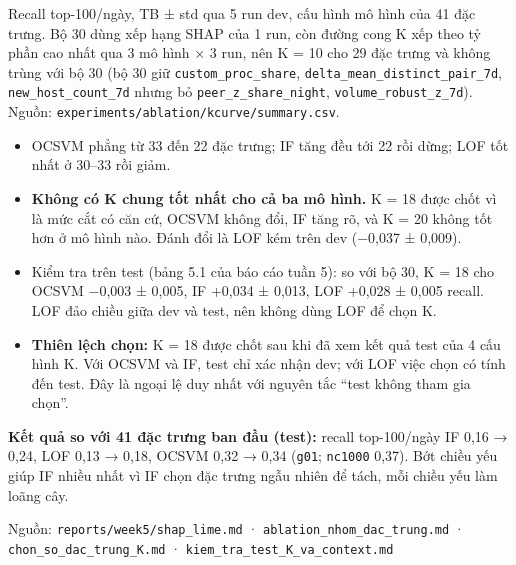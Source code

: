 \documentclass[
  11pt,
]{article}
\providecommand{\tightlist}{%
  \setlength{\itemsep}{0pt}\setlength{\parskip}{0pt}}
\begin{document}
Recall top-100/ngày, TB ± std qua 5 run dev, cấu hình mô hình của 41 đặc
trưng. Bộ 30 dùng xếp hạng SHAP của 1 run, còn đường cong K xếp theo tỷ
phần cao nhất qua 3 mô hình × 3 run, nên K = 10 cho 29 đặc trưng và
không trùng với bộ 30 (bộ 30 giữ
\texttt{custom\_\allowbreak{}proc\_\allowbreak{}share},
\texttt{delta\_\allowbreak{}mean\_\allowbreak{}distinct\_\allowbreak{}pair\_\allowbreak{}7d},
\texttt{new\_\allowbreak{}host\_\allowbreak{}count\_\allowbreak{}7d}
nhưng bỏ
\texttt{peer\_\allowbreak{}z\_\allowbreak{}share\_\allowbreak{}night},
\texttt{volume\_\allowbreak{}robust\_\allowbreak{}z\_\allowbreak{}7d}).
Nguồn:
\texttt{experiments/\allowbreak{}ablation/\allowbreak{}kcurve/\allowbreak{}summary.\allowbreak{}csv}.

\begin{itemize}
\tightlist
\item
  OCSVM phẳng từ 33 đến 22 đặc trưng; IF tăng đều tới 22 rồi dừng; LOF
  tốt nhất ở 30--33 rồi giảm.
\item
  \textbf{Không có K chung tốt nhất cho cả ba mô hình.} K = 18 được chốt
  vì là mức cắt có căn cứ, OCSVM không đổi, IF tăng rõ, và K = 20 không
  tốt hơn ở mô hình nào. Đánh đổi là LOF kém trên dev (−0,037 ± 0,009).
\item
  Kiểm tra trên test (bảng 5.1 của báo cáo tuần 5): so với bộ 30, K = 18
  cho OCSVM −0,003 ± 0,005, IF +0,034 ± 0,013, LOF +0,028 ± 0,005
  recall. LOF đảo chiều giữa dev và test, nên không dùng LOF để chọn K.
\item
  \textbf{Thiên lệch chọn:} K = 18 được chốt sau khi đã xem kết quả test
  của 4 cấu hình K. Với OCSVM và IF, test chỉ xác nhận dev; với LOF việc
  chọn có tính đến test. Đây là ngoại lệ duy nhất với nguyên tắc ``test
  không tham gia chọn''.
\end{itemize}

\textbf{Kết quả so với 41 đặc trưng ban đầu (test):} recall top-100/ngày
IF 0,16 → 0,24, LOF 0,13 → 0,18, OCSVM 0,32 → 0,34 (\texttt{g01};
\texttt{nc1000} 0,37). Bớt chiều yếu giúp IF nhiều nhất vì IF chọn đặc
trưng ngẫu nhiên để tách, mỗi chiều yếu làm loãng cây.

Nguồn:
\texttt{reports/\allowbreak{}week5/\allowbreak{}shap\_\allowbreak{}lime.\allowbreak{}md}
·
\texttt{ablation\_\allowbreak{}nhom\_\allowbreak{}dac\_\allowbreak{}trung.\allowbreak{}md}
·
\texttt{chon\_\allowbreak{}so\_\allowbreak{}dac\_\allowbreak{}trung\_\allowbreak{}K.\allowbreak{}md}
·
\texttt{kiem\_\allowbreak{}tra\_\allowbreak{}test\_\allowbreak{}K\_\allowbreak{}va\_\allowbreak{}context.\allowbreak{}md}
\end{document}
